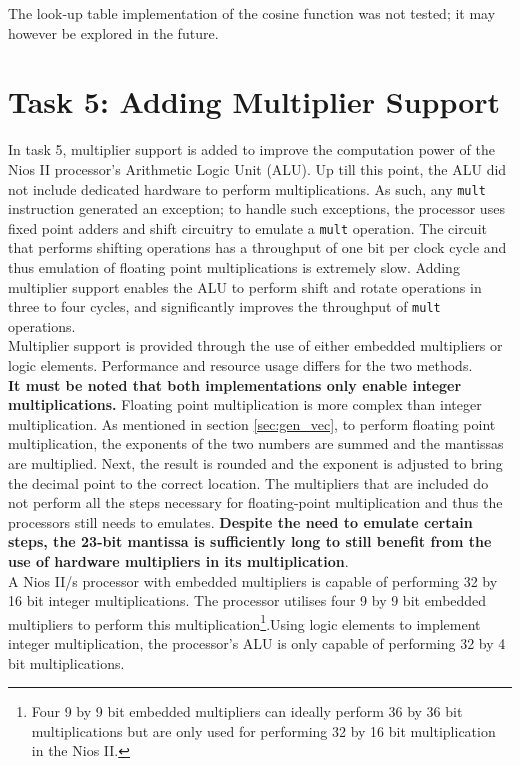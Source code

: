 \documentclass{article}
\begin{document}
The look-up table implementation of the cosine function was not tested; it may however be explored in the future.\\

\section{Task 5: Adding Multiplier Support}
In task 5, multiplier support is added to improve the computation power of the Nios II processor's Arithmetic Logic Unit (ALU). Up till this point, the ALU did not include dedicated hardware to perform multiplications. As such, any {\tt mult} instruction generated an exception; to handle such exceptions, the processor uses fixed point adders and shift circuitry to emulate a {\tt mult} operation. The circuit that performs shifting operations has a throughput of one bit per clock cycle and thus emulation of floating point multiplications is extremely slow. Adding multiplier support enables the ALU to perform shift and rotate operations in three to four cycles, and significantly improves the throughput of {\tt mult} operations\cite{multiplier}. \\

Multiplier support is provided through the use of either embedded multipliers or logic elements. Performance and resource usage differs for the two methods.\\

\textbf{It must be noted that both implementations only enable integer multiplications.} Floating point multiplication is more complex than integer multiplication. As mentioned in section \ref{sec:gen_vec}, to perform floating point multiplication, the exponents of the two numbers are summed and the mantissas are multiplied. Next, the result is rounded and the exponent is adjusted to bring the decimal point to the correct location. The multipliers that are included do not perform all the steps necessary for floating-point multiplication and thus the processors still needs to emulates. \textbf{Despite the need to emulate certain steps, the 23-bit mantissa is sufficiently long to still benefit from the use of hardware multipliers in its multiplication}.\\


A Nios II/s processor with embedded multipliers is capable of performing 32 by 16 bit integer multiplications\cite{multiplier}. The processor utilises four 9 by 9 bit embedded multipliers to perform this multiplication\footnote{Four 9 by 9 bit embedded multipliers can ideally perform 36 by 36 bit multiplications but are only used for performing 32 by 16 bit multiplication in the Nios II.}.Using logic elements to implement integer multiplication, the processor's ALU is only capable of performing 32 by 4 bit multiplications\cite{multiplier}.\\
\end{document}
